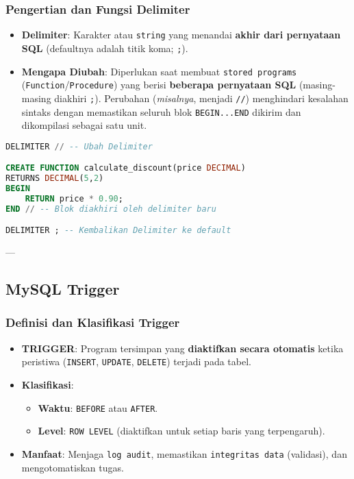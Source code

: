 \documentclass{article}
\begin{document}
\subsubsection{Pengertian dan Fungsi Delimiter}
\begin{itemize}
    \item \textbf{Delimiter}: Karakter atau \texttt{string} yang menandai \textbf{akhir dari pernyataan SQL} (defaultnya adalah titik koma; \texttt{;}).
    \item \textbf{Mengapa Diubah}: Diperlukan saat membuat \texttt{stored programs} (\texttt{Function}/\texttt{Procedure}) yang berisi \textbf{beberapa pernyataan SQL} (masing-masing diakhiri \texttt{;}). Perubahan (\textit{misalnya}, menjadi \texttt{//}) menghindari kesalahan sintaks dengan memastikan seluruh blok \texttt{BEGIN...END} dikirim dan dikompilasi sebagai satu unit.
\end{itemize}
\begin{lstlisting}[language=SQL, caption={Contoh Penggunaan DELIMITER}, captionpos=b]
DELIMITER // -- Ubah Delimiter

CREATE FUNCTION calculate_discount(price DECIMAL)
RETURNS DECIMAL(5,2)
BEGIN
    RETURN price * 0.90; 
END // -- Blok diakhiri oleh delimiter baru

DELIMITER ; -- Kembalikan Delimiter ke default
\end{lstlisting}

---

\subsection{MySQL Trigger}

\subsubsection{Definisi dan Klasifikasi Trigger}
\begin{itemize}
    \item \textbf{TRIGGER}: Program tersimpan yang \textbf{diaktifkan secara otomatis} ketika peristiwa (\texttt{INSERT}, \texttt{UPDATE}, \texttt{DELETE}) terjadi pada tabel.
    \item \textbf{Klasifikasi}:
          \begin{itemize}
              \item \textbf{Waktu}: \texttt{BEFORE} atau \texttt{AFTER}.
              \item \textbf{Level}: \texttt{ROW LEVEL} (diaktifkan untuk setiap baris yang terpengaruh).
          \end{itemize}
    \item \textbf{Manfaat}: Menjaga \texttt{log audit}, memastikan \texttt{integritas data} (validasi), dan mengotomatiskan tugas.
\end{itemize}
\end{document}
